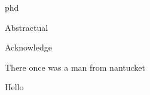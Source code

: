 \documentclass[times,12pt,titlepage]{mstthesis}
\begin{document}
\setlength{\parskip}{0pt}
\setlength{\parindent}{0.5in}

\begin{ThesisTitlePage}{phd}

\author{\MakeUppercase{Stephen Curtis Jackson}}







\end{ThesisTitlePage}


%

\begin{ThesisAbstract}
Abstractual
\end{ThesisAbstract}

\begin{ThesisAcknowledgment}
Acknowledge
\end{ThesisAcknowledgment}

\begin{ThesisFrontMatter}
\tableofcontents
\listoffigures
\listoftables
\end{ThesisFrontMatter}

\begin{ThesisBody}
There once was a man from nantucket
\end{ThesisBody}


%

%

\begin{Vita}
Hello
\end{Vita}

%
%
\end{document}
